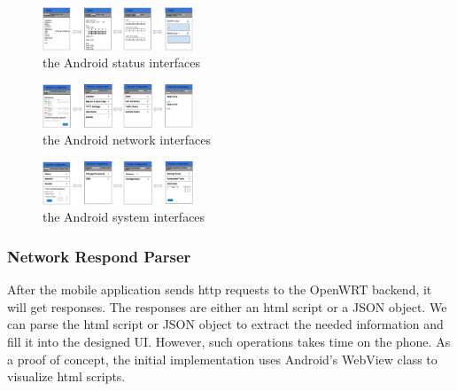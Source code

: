 	\begin{figure}
		\centering
		\includegraphics[width=0.4\textwidth]{UIstatus.png}
		\caption{the Android status interfaces}
		\label{OpenWRT:androidstatus}
	\end{figure}
	
	\begin{figure}
		\centering
		\includegraphics[width=0.4\textwidth]{UInetwork.png}
		\caption{the Android network interfaces}
		\label{OpenWRT:androidnetwork}
	\end{figure}
	\begin{figure}
		\centering
		\includegraphics[width=0.4\textwidth]{UIsystem.png}
		\caption{the Android system interfaces}
		\label{OpenWRT:androidsystem}
	\end{figure}

\subsubsection{Network Respond Parser}

After the mobile application sends http requests to the OpenWRT backend, it will get responses. The responses are either an html script or a JSON object. We can parse the html script or JSON object to extract the needed information and fill it into the designed UI. However, such operations takes time on the phone. As a proof of concept, the initial implementation uses Android's WebView class to visualize html scripts.


